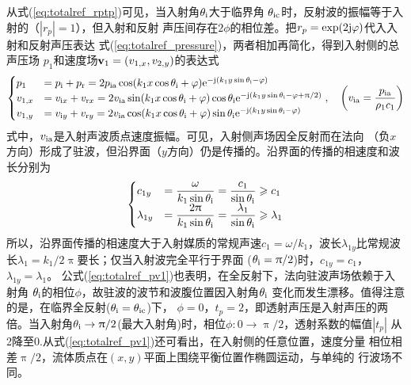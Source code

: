 \documentclass[UTF8]{ctexbook}
\begin{document}
从式(\ref{eq:totalref_rptp})可见，当入射角$\theta_\text{i}$大于临界角
$\theta_\text{ic}$时，反射波的振幅等于入射的（$|r_p|=1$），但入射和反射
声压间存在$2\phi$的相位差。把$r_p=\exp(2\mathrm{j} \varphi)$代入入射和反射声压表达
式(\ref{eq:totalref_pressure})，两者相加再简化，得到入射侧的总声压场
$p_1$和速度场$\vb{v}_1=(v_{1,x}, v_{2,y})$的表达式
\begin{equation}
	\label{eq:totalref_pv1}
	\begin{cases}
		p_1&= p\st{i}+p\st{r} = 2p\st{ia}\cos(k_1x\cos\theta\st{i}+\phi)
		\me^{-\mj (k_1y\sin\theta\st{i}-\phi)}\\
		v_{1,x}&= v_{\mi x} + v_{\mathrm{r}x} = 2v\st{ia}\sin
		(k_1x\cos\theta\st{i}+\phi)\cos\theta\st{i}
		\me^{-\mj \qty(k_1y\sin\theta\st{i}-\phi+ \uppi/2)}\\
		v_{1,y}&= v_{\mi y} + v_{\mathrm{r}y} = 2v\st{ia}\cos
		(k_1x\cos\theta\st{i}+\phi)\sin\theta\st{i}
		\me^{-\mj \qty(k_1y\sin\theta\st{i}-\phi)}
	\end{cases}
	\qc \qty(v\st{ia} = \frac{p\st{ia}}{\rho_1c_1})
\end{equation}
式中，$v_\text{ia}$是入射声波质点速度振幅。可见，入射侧声场因全反射而在法向
（负$x$方向）形成了驻波，但沿界面（$y$方向）仍是传播的。沿界面的传播的相速度和波长分别为
\begin{equation}
	\label{eq:totalref_interface1}
	\begin{cases}
		c_{1y} & = \dfrac{\omega}{k_1\sin \theta_\text{i}}
		=\dfrac{c_1}{\sin\theta_\text{i}} \geqslant c_1\\
		\displaystyle
		\lambda_{1y} &= \dfrac{2\uppi}{k_1\sin\theta_\text{i}}
		=\dfrac{\lambda_1}{\sin\theta_\text{i}} \geqslant\lambda_1
	\end{cases}
\end{equation}
所以，沿界面传播的相速度大于入射媒质的常规声速$c_1=\omega /k_1$，波长$\lambda
_{1y}$比常规波长$\lambda_1 = k_1/2\uppi$要长；仅当入射波完全平行于界面
($\theta_\text{i}=\uppi/2$)时，$c_{1y}=c_1$，$\lambda_{1y}=\lambda_1$。
公式(\ref{eq:totalref_pv1})也表明，在全反射下，法向驻波声场依赖于入射角
$\theta_\text{i}$的相位$\phi$，故驻波的波节和波腹位置因入射角$\theta_\text{i}$
变化而发生漂移。值得注意的是，在临界全反射($\theta_\text{i}=\theta_\text{ic}$)下，
$\phi=0$，$t_p=2$，即透射声压是入射声压的两倍。当入射角$\theta_\text{i}\to 
\uppi/2$(最大入射角)时，相位$\phi: 0\to \uppi/2$，透射系数的幅值$|t_p|$
从2降至0.从式(\ref{eq:totalref_pv1})还可看出，在入射侧的任意位置，速度分量
相位相差$\uppi/2$，流体质点在$(x,y)$平面上围绕平衡位置作椭圆运动，与单纯的
行波场不同。
\end{document}
